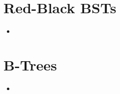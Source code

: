 \documentclass[8pt,a4paper,compress]{beamer}
\begin{document}
\section{Red-Black BSTs}
\begin{frame}[fragile]
\begin{itemize}
\item 
\end{itemize}
\end{frame}

\section{B-Trees}
\begin{frame}[fragile]
\begin{itemize}
\item 
\end{itemize}
\end{frame}
\end{document}
